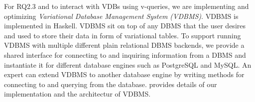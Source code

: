 For RQ2.3 and to interact with VDBs using v-queries, we are implementing
and optimizing
\emph{Variational Database Management System (VDBMS)}.
VDBMS is implemented in Haskell. VDBMS sit on 
top of any DBMS that the user desires and used to store their data 
in form of variational tables.
To support running VDBMS with multiple different plain relational DBMS backends,
we provide
a shared interface
for connecting to and inquiring information from a DBMS and
instantiate it for different database engines such as PostgreSQL and
MySQL. 
An expert can extend VDBMS to another database engine by
writing methods for connecting to and querying from the database.
 provides details of our implementation and the architectur of 
VDBMS.






